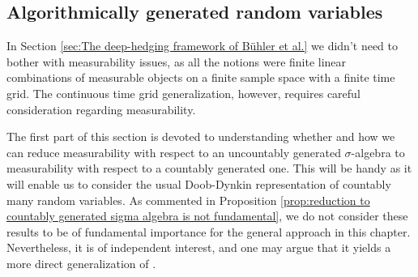 \documentclass[11pt,a4paper,twoside,openany]{report}
\numberwithin{equation}{section}
\theoremstyle{plain} %
\theoremstyle{definition} %
\theoremstyle{remark} %
\let\parencite\authnumparencite
\begin{document}
 \subsection{Algorithmically generated random variables}\label{sec:algorithmically generated random variables}
 In Section \ref{sec:The deep-hedging framework of Bühler et al.} we didn't need to bother with measurability issues, as all the notions were finite linear combinations of measurable objects on a finite sample space with a finite time grid. The continuous time grid generalization, however, requires careful consideration regarding measurability. 

 
 The first part of this section is devoted to understanding whether and how we can reduce measurability with respect to an uncountably generated \(\sigma\)-algebra to measurability with respect to a countably generated one. This will be handy as it will enable us to consider the usual Doob-Dynkin representation of countably many random variables. As commented in Proposition \ref{prop:reduction to countably generated sigma algebra is not fundamental}, we do not consider these results to be of fundamental importance for the general approach in this chapter. Nevertheless, it is of independent interest, and one may argue that it yields a more direct generalization of \parencite{Buehler2018DeepHedging}.
\end{document}
